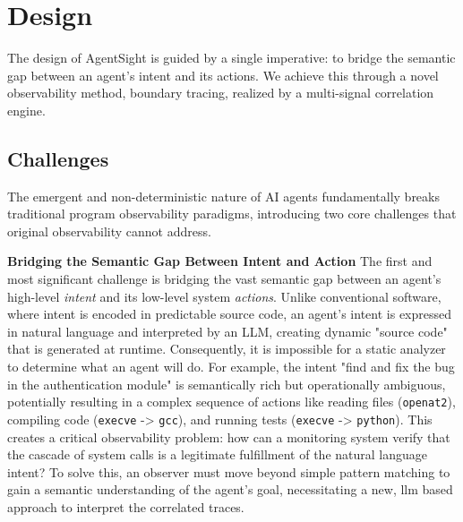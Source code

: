 % 
\section{Design}

The design of AgentSight is guided by a single imperative: to bridge the semantic gap between an agent's intent and its actions. We achieve this through a novel observability method, boundary tracing, realized by a multi-signal correlation engine.

\subsection{Challenges}

The emergent and non-deterministic nature of AI agents fundamentally breaks traditional program observability paradigms, introducing two core challenges that original observability cannot address.

\textbf{Bridging the Semantic Gap Between Intent and Action}
The first and most significant challenge is bridging the vast semantic gap between an agent's high-level \textit{intent} and its low-level system \textit{actions}. Unlike conventional software, where intent is encoded in predictable source code, an agent's intent is expressed in natural language and interpreted by an LLM, creating dynamic "source code" that is generated at runtime. Consequently, it is impossible for a static analyzer to determine what an agent will do. For example, the intent "find and fix the bug in the authentication module" is semantically rich but operationally ambiguous, potentially resulting in a complex sequence of actions like reading files (\texttt{openat2}), compiling code (\texttt{execve} -> \texttt{gcc}), and running tests (\texttt{execve} -> \texttt{python}). This creates a critical observability problem: how can a monitoring system verify that the cascade of system calls is a legitimate fulfillment of the natural language intent? To solve this, an observer must move beyond simple pattern matching to gain a semantic understanding of the agent's goal, necessitating a new, llm based approach to interpret the correlated traces.

